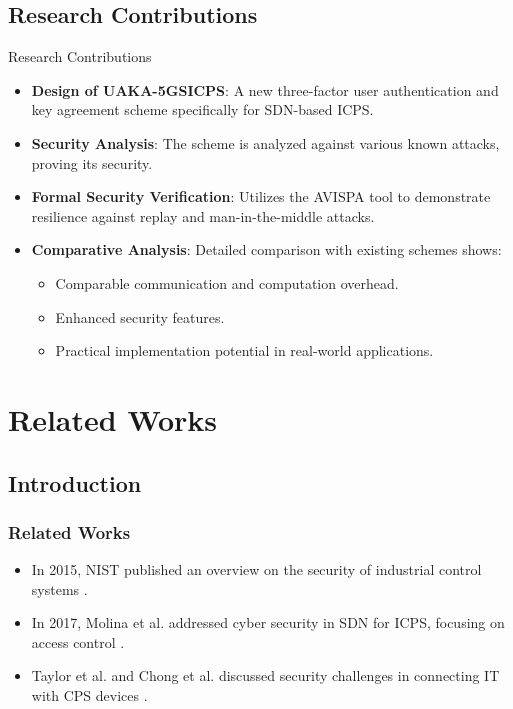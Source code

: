 \documentclass[9pt,handout]{beamer}
\begin{document}
\subsection{Research Contributions}

\begin{frame}{Research Contributions}

\begin{itemize}
    \item \textbf{Design of UAKA-5GSICPS}: A new three-factor user authentication and key agreement scheme specifically for SDN-based ICPS.
    \item \textbf{Security Analysis}: The scheme is analyzed against various known attacks, proving its security.
    \item \textbf{Formal Security Verification}: Utilizes the AVISPA tool to demonstrate resilience against replay and man-in-the-middle attacks.
    \item \textbf{Comparative Analysis}: Detailed comparison with existing schemes shows:
    \begin{itemize}
        \item Comparable communication and computation overhead.
        \item Enhanced security features.
        \item Practical implementation potential in real-world applications.
    \end{itemize}
    
\end{itemize}

\end{frame}
\section{Related Works}
\begin{frame}
\subsection{Introduction}
\frametitle{Related Works}

\begin{itemize}
    \item In 2015, NIST published an overview on the security of industrial control systems \cite{NIST2015}.
    \item In 2017, Molina et al. addressed cyber security in SDN for ICPS, focusing on access control \cite{Molina2018}.
    \item Taylor et al. and Chong et al. discussed security challenges in connecting IT with CPS devices \cite{Taylor2017, Chong2019}.
\end{itemize}

\end{frame}
\end{document}
